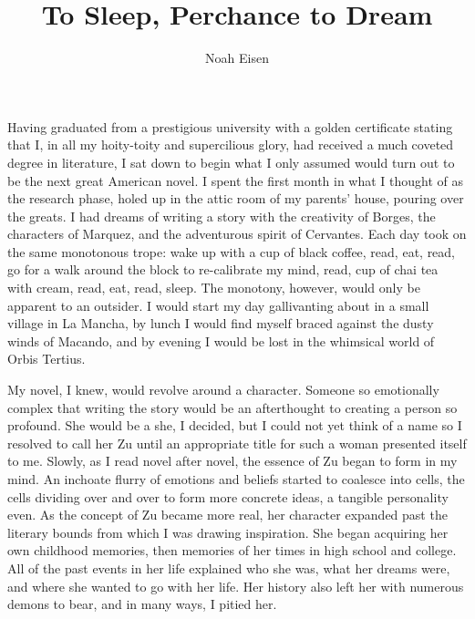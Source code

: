 \documentclass[12pt,oneside,openany]{memoir}
\begin{document}
\title{To Sleep, Perchance to Dream}
\author{Noah Eisen}
\date{}
\maketitle
\thispagestyle{empty}
\pagestyle{empty}
\setlength{\parindent}{30pt}
\bigskip
\bigskip
\indent Having graduated from a prestigious university with a golden certificate stating that I, in all my hoity-toity and supercilious glory, had received a much coveted degree in literature, I sat down to begin what I only assumed would turn out to be the next great American novel. I spent the first month in what I thought of as the research phase, holed up in the attic room of my parents’ house, pouring over the greats.  I had dreams of writing a story with the creativity of Borges, the characters of Marquez, and the adventurous spirit of Cervantes. Each day took on the same monotonous trope: wake up with a cup of black coffee, read, eat, read, go for a walk around the block to re-calibrate my mind, read, cup of chai tea with cream, read, eat, read, sleep. The monotony, however, would only be apparent to an outsider. I would start my day gallivanting about in a small village in La Mancha, by lunch I would find myself braced against the dusty winds of Macando, and by evening I would be lost in the whimsical world of Orbis Tertius.

My novel, I knew, would revolve around a character. Someone so emotionally complex that writing the story would be an afterthought to creating a person so profound. She would be a she, I decided, but I could not yet think of a name so I resolved to call her Zu until an appropriate title for such a woman presented itself to me. Slowly, as I read novel after novel, the essence of Zu began to form in my mind. An inchoate flurry of emotions and beliefs started to coalesce into cells, the cells dividing over and over to form more concrete ideas, a tangible personality even. As the concept of Zu became more real, her character expanded past the literary bounds from which I was drawing inspiration. She began acquiring her own childhood memories, then memories of her times in high school and college. All of the past events in her life explained who she was, what her dreams were, and where she wanted to go with her life. Her history also left her with numerous demons to bear, and in many ways, I pitied her.
\end{document}
